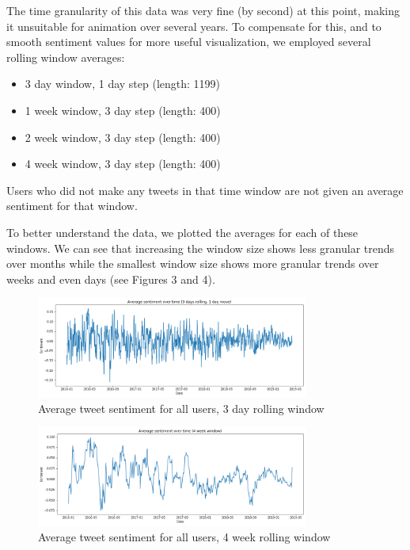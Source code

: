 \documentclass[11pt]{article}
\begin{document}
The time granularity of this data was very fine (by second) at this point, making it unsuitable for animation over several years. To compensate for this, and to smooth sentiment values for more useful visualization, we employed several rolling window averages:\newline
\begin{itemize}
    \item 3 day window, 1 day step (length: 1199)
    \item 1 week window, 3 day step (length: 400)
    \item 2 week window, 3 day step (length: 400)
    \item 4 week window, 3 day step (length: 400)
\end{itemize}

Users who did not make any tweets in that time window are not given an average sentiment for that window.\newline

To better understand the data, we plotted the averages for each of these windows. We can see that increasing the window size shows less granular trends over months while the smallest window size shows more granular trends over weeks and even days (see Figures 3 and 4).

\begin{figure}[h!]
    \centering
     \includegraphics[width=0.8\textwidth]{avg_sentiment_over_time_big__3day}
        \caption{Average tweet sentiment for all users, 3 day rolling window}
\end{figure}

\begin{figure}[h!]
    \centering
     \includegraphics[width=0.8\textwidth]{avg_sentiment_over_time_big_4week}
        \caption{Average tweet sentiment for all users, 4 week rolling window}
\end{figure}
\end{document}
